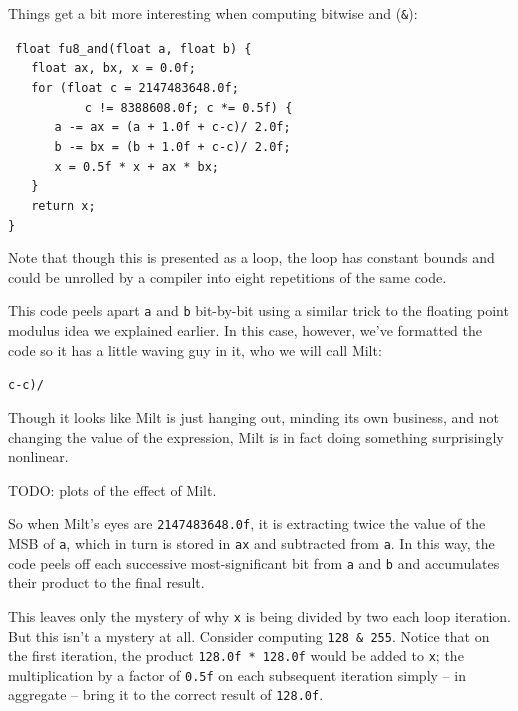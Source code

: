 \documentclass{acmsiggraph}
\theoremstyle{remark}
\theoremstyle{definition}
\begin{document}
Things get a bit more interesting when computing bitwise and ({\tt \&}):

{\tt
float fu8\_and(float a, float b) \{ \\
$\phantom{XX}$float ax, bx, x = 0.0f; \\
$\phantom{XX}$for (float c = 2147483648.0f;\\
$\phantom{XXXXXX}$ c != 8388608.0f; c *= 0.5f) \{ \\
$\phantom{XXXX}$a -= ax = (a + 1.0f + c-c)/ 2.0f; \\
$\phantom{XXXX}$b -= bx = (b + 1.0f + c-c)/ 2.0f; \\
$\phantom{XXXX}$x = 0.5f * x + ax * bx; \\
$\phantom{XX}$\} \\
$\phantom{XX}$return x; \\
\}
}

Note that though this is presented as a loop, the loop has constant bounds and could be unrolled by a compiler into eight repetitions of the same code.

This code peels apart {\tt a} and {\tt b} bit-by-bit using a similar trick to the floating point modulus idea we explained earlier.
In this case, however, we've formatted the code so it has a little waving guy in it, who we will call Milt:

\begin{center}
\huge
{\tt c-c)/}
\end{center}

Though it looks like Milt is just hanging out, minding its own business, and not changing the value of the expression,
Milt is in fact doing something surprisingly nonlinear.

TODO: plots of the effect of Milt.

So when Milt's eyes are {\tt 2147483648.0f}, it is extracting twice the value of the MSB of {\tt a},
which in turn is stored in {\tt ax} and subtracted from {\tt a}.
In this way, the code peels off each successive most-significant bit from {\tt a} and {\tt b} and accumulates their product to the final result.

This leaves only the mystery of why {\tt x} is being divided by two each loop iteration.
But this isn't a mystery at all.
Consider computing {\tt 128 \& 255}.
Notice that on the first iteration, the product {\tt 128.0f * 128.0f} would be added to {\tt x};
the multiplication by a factor of {\tt 0.5f} on each subsequent iteration simply -- in aggregate -- bring it to the correct result of {\tt 128.0f}.
\end{document}
